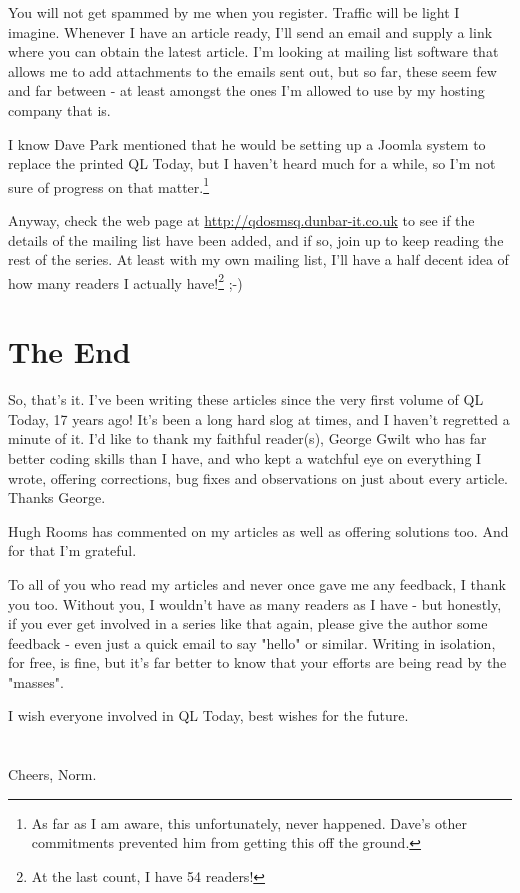 You will not get spammed by me when you register. Traffic will be
    light I imagine. Whenever I have an article ready, I'll send an email and
    supply a link where you can obtain the latest article. I'm looking at
    mailing list software that allows me to add attachments to the emails sent
    out, but so far, these seem few and far between -{} at least amongst the
    ones I'm allowed to use by my hosting company that is.

I know Dave Park mentioned that he would be setting up a Joomla
    system to replace the printed QL Today, but I haven't heard much for a
    while, so I'm not sure of progress on that matter.\footnote{As far as I am aware, this unfortunately, never happened. Dave's other commitments prevented him from getting this off the ground.}

Anyway, check the web page at \url{http://qdosmsq.dunbar-it.co.uk} to see
    if the details of the mailing list have been added, and if so, join up to
    keep reading the rest of the series. At least with my own mailing list,
    I'll have a half decent idea of how many readers I actually have!\footnote{At the last count, I have 54 readers!}
    ;-{})

\section{The End}
\label{ch34-the-end}%

So, that's it. I've been writing these articles since the very first
    volume of QL Today, 17 years ago! It's been a long hard slog at times, and
    I haven't regretted a minute of it. I'd like to thank my faithful
    reader(s), George Gwilt who has far better coding skills than I have, and
    who kept a watchful eye on everything I wrote, offering corrections, bug
    fixes and observations on just about every article. Thanks George.

Hugh Rooms has commented on my articles as well as offering
    solutions too. And for that I'm grateful.

To all of you who read my articles and never once gave me any
    feedback, I thank you too. Without you, I wouldn't have as many readers as
    I have -{} but honestly, if you ever get involved in a series like that
    again, please give the author some feedback -{} even just a quick email to
    say "hello" or similar. Writing in isolation, for free, is fine, but it's
    far better to know that your efforts are being read by the "masses".
 

I wish everyone involved in QL Today, best wishes for the future.
\\
\\
\\
    Cheers, Norm.
